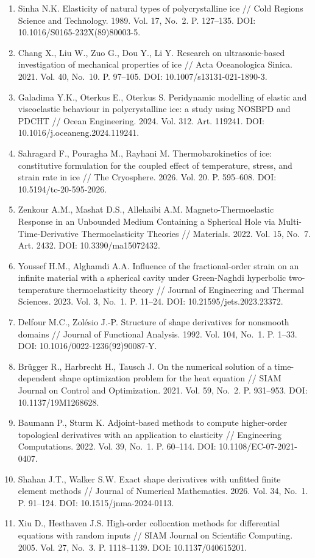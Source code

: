 \documentclass[
]{article}
\providecommand{\tightlist}{%
  \setlength{\itemsep}{0pt}\setlength{\parskip}{0pt}}
\begin{document}
\begin{enumerate}
\def\labelenumi{\arabic{enumi}.}
\tightlist
\item
  Sinha N.K. Elasticity of natural types of polycrystalline ice // Cold
  Regions Science and Technology. 1989. Vol. 17, No.~2. P. 127--135.
  DOI: 10.1016/S0165-232X(89)80003-5.
\item
  Chang X., Liu W., Zuo G., Dou Y., Li Y. Research on ultrasonic-based
  investigation of mechanical properties of ice // Acta Oceanologica
  Sinica. 2021. Vol. 40, No.~10. P. 97--105. DOI:
  10.1007/s13131-021-1890-3.
\item
  Galadima Y.K., Oterkus E., Oterkus S. Peridynamic modelling of elastic
  and viscoelastic behaviour in polycrystalline ice: a study using
  NOSBPD and PDCHT // Ocean Engineering. 2024. Vol. 312. Art. 119241.
  DOI: 10.1016/j.oceaneng.2024.119241.
\item
  Sahragard F., Pouragha M., Rayhani M. Thermobarokinetics of ice:
  constitutive formulation for the coupled effect of temperature,
  stress, and strain rate in ice // The Cryosphere. 2026. Vol. 20. P.
  595--608. DOI: 10.5194/tc-20-595-2026.
\item
  Zenkour A.M., Mashat D.S., Allehaibi A.M. Magneto-Thermoelastic
  Response in an Unbounded Medium Containing a Spherical Hole via
  Multi-Time-Derivative Thermoelasticity Theories // Materials. 2022.
  Vol. 15, No.~7. Art. 2432. DOI: 10.3390/ma15072432.
\item
  Youssef H.M., Alghamdi A.A. Influence of the fractional-order strain
  on an infinite material with a spherical cavity under Green-Naghdi
  hyperbolic two-temperature thermoelasticity theory // Journal of
  Engineering and Thermal Sciences. 2023. Vol. 3, No.~1. P. 11--24. DOI:
  10.21595/jets.2023.23372.
\item
  Delfour M.C., Zolésio J.-P. Structure of shape derivatives for
  nonsmooth domains // Journal of Functional Analysis. 1992. Vol. 104,
  No.~1. P. 1--33. DOI: 10.1016/0022-1236(92)90087-Y.
\item
  Brügger R., Harbrecht H., Tausch J. On the numerical solution of a
  time-dependent shape optimization problem for the heat equation //
  SIAM Journal on Control and Optimization. 2021. Vol. 59, No.~2. P.
  931--953. DOI: 10.1137/19M1268628.
\item
  Baumann P., Sturm K. Adjoint-based methods to compute higher-order
  topological derivatives with an application to elasticity //
  Engineering Computations. 2022. Vol. 39, No.~1. P. 60--114. DOI:
  10.1108/EC-07-2021-0407.
\item
  Shahan J.T., Walker S.W. Exact shape derivatives with unfitted finite
  element methods // Journal of Numerical Mathematics. 2026. Vol. 34,
  No.~1. P. 91--124. DOI: 10.1515/jnma-2024-0113.
\item
  Xiu D., Hesthaven J.S. High-order collocation methods for differential
  equations with random inputs // SIAM Journal on Scientific Computing.
  2005. Vol. 27, No.~3. P. 1118--1139. DOI: 10.1137/040615201.
\end{enumerate}
\end{document}
